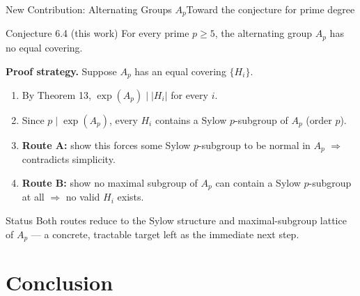 \documentclass[9pt,aspectratio=169]{beamer}
\begin{document}
\begin{frame}{New Contribution: Alternating Groups $A_p$}{Toward the conjecture for prime degree}
\begin{block}{Conjecture 6.4 (this work)}
For every prime $p \ge 5$, the alternating group $A_p$ has no equal covering.
\end{block}
\textbf{Proof strategy.} Suppose $A_p$ has an equal covering $\{H_i\}$.
\begin{enumerate}
\item By Theorem 13, $\exp(A_p) \mid |H_i|$ for every $i$.
\item Since $p \mid \exp(A_p)$, every $H_i$ contains a Sylow $p$-subgroup of $A_p$ (order $p$).
\item \textbf{Route A:} show this forces some Sylow $p$-subgroup to be normal in $A_p$ $\Rightarrow$ contradicts simplicity.
\item \textbf{Route B:} show no maximal subgroup of $A_p$ can contain a Sylow $p$-subgroup at all $\Rightarrow$ no valid $H_i$ exists.
\end{enumerate}
\begin{alertblock}{Status}
Both routes reduce to the Sylow structure and maximal-subgroup lattice of $A_p$ — a concrete, tractable target left as the immediate next step.
\end{alertblock}
\end{frame}

\section{Conclusion}
\end{document}
